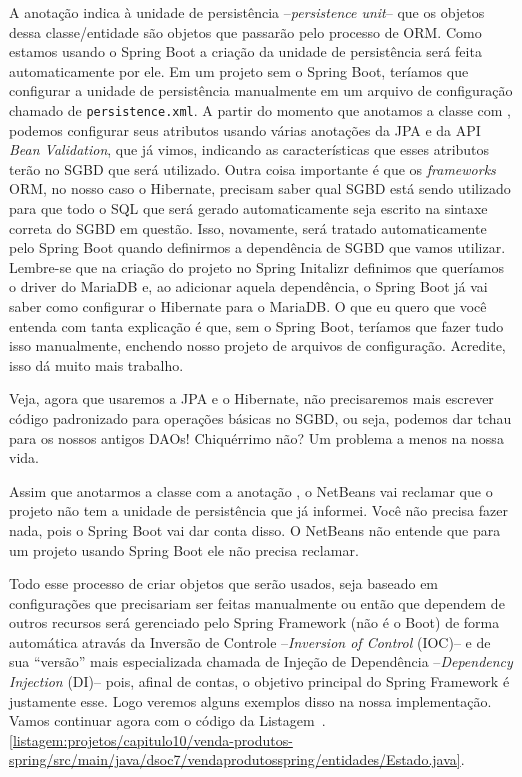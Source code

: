 A anotação  indica à unidade de persistência --\textit{persistence unit}-- que os objetos dessa classe/entidade são objetos que passarão pelo processo de ORM. Como estamos usando o Spring Boot a criação da unidade de persistência será feita automaticamente por ele. Em um projeto sem o Spring Boot, teríamos que configurar a unidade de persistência manualmente em um arquivo de configuração chamado de \texttt{persistence.xml}. A partir do momento que anotamos a classe com , podemos configurar seus atributos usando várias anotações da JPA e da API \textit{Bean Validation}, que já vimos, indicando as características que esses atributos terão no SGBD que será utilizado. Outra coisa importante é que os \textit{frameworks} ORM, no nosso caso o Hibernate, precisam saber qual SGBD está sendo utilizado para que todo o SQL que será gerado automaticamente seja escrito na sintaxe correta do SGBD em questão. Isso, novamente, será tratado automaticamente pelo Spring Boot quando definirmos a dependência de SGBD que vamos utilizar. Lembre-se que na criação do projeto no Spring Initalizr definimos que queríamos o driver do MariaDB e, ao adicionar aquela dependência, o Spring Boot já vai saber como configurar o Hibernate para o MariaDB. O que eu quero que você entenda com tanta explicação é que, sem o Spring Boot, teríamos que fazer tudo isso manualmente, enchendo nosso projeto de arquivos de configuração. Acredite, isso dá muito mais trabalho.

Veja, agora que usaremos a JPA e o Hibernate, não precisaremos mais escrever código padronizado para operações básicas no SGBD, ou seja, podemos dar tchau para os nossos antigos DAOs! Chiquérrimo não? Um problema a menos na nossa vida.

Assim que anotarmos a classe com a anotação , o NetBeans vai reclamar que o projeto não tem a unidade de persistência que já informei. Você não precisa fazer nada, pois o Spring Boot vai dar conta disso. O NetBeans não entende que para um projeto usando Spring Boot ele não precisa reclamar.

Todo esse processo de criar objetos que serão usados, seja baseado em configurações que precisariam ser feitas manualmente ou então que dependem de outros recursos será gerenciado pelo Spring Framework (não é o Boot) de forma automática atravás da Inversão de Controle --\textit{Inversion of Control} (IOC)-- e de sua ``versão'' mais especializada chamada de Injeção de Dependência --\textit{Dependency Injection} (DI)-- pois, afinal de contas, o objetivo principal do Spring Framework é justamente esse. Logo veremos alguns exemplos disso na nossa implementação. Vamos continuar agora com o código da Listagem~\thechapter.\ref{listagem:projetos/capitulo10/venda-produtos-spring/src/main/java/dsoc7/vendaprodutosspring/entidades/Estado.java}.

